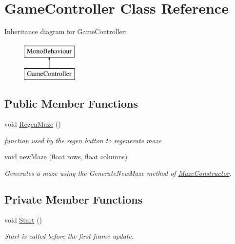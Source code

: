 \hypertarget{class_game_controller}{}\section{Game\+Controller Class Reference}
\label{class_game_controller}
Inheritance diagram for Game\+Controller\+:\begin{figure}[H]
\begin{center}
\leavevmode
\includegraphics[height=2.000000cm]{class_game_controller}
\end{center}
\end{figure}
\subsection*{Public Member Functions}
\begin{DoxyCompactItemize}
\item 
void \mbox{\hyperlink{class_game_controller_ab371cbafba07091cb7b24e8338c14a1f}{Regen\+Maze}} ()
\begin{DoxyCompactList}\small\item\em function used by the regen button to regenerate maze \end{DoxyCompactList}\item 
void \mbox{\hyperlink{class_game_controller_a1a65ce7d8077d3ee9fb43b59791181c2}{new\+Maze}} (float rows, float columns)
\begin{DoxyCompactList}\small\item\em Generates a maze using the Generate\+New\+Maze method of \mbox{\hyperlink{class_maze_constructor}{Maze\+Constructor}}. \end{DoxyCompactList}\end{DoxyCompactItemize}
\subsection*{Private Member Functions}
\begin{DoxyCompactItemize}
\item 
void \mbox{\hyperlink{class_game_controller_a97788a7aa0f09c8d748781683e5f045b}{Start}} ()
\begin{DoxyCompactList}\small\item\em Start is called before the first frame update. \end{DoxyCompactList}\end{DoxyCompactItemize}
